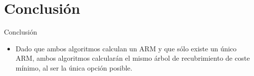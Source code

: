 \documentclass[aspectratio=169]{beamer}
\begin{document}
\section{Conclusión}
\begin{frame}{Conclusión}
    \begin{itemize}
        \item Dado que ambos algoritmos calculan un ARM y que sólo existe un único ARM, ambos algoritmos calcularán el mismo árbol de recubrimiento de coste mínimo, al ser la única opción posible.
    \end{itemize}
\end{frame}
\end{document}
